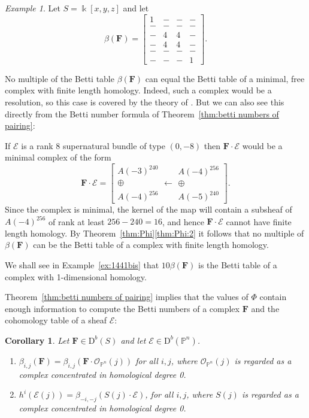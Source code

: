 \documentclass[12pt]{amsart}
\newtheorem{cor}[lemma]{Corollary}
\theoremstyle{definition}
\theoremstyle{remark}
\newtheorem{example}[lemma]{Example}
\newcommand{\kk}{\Bbbk}
\newcommand{\PP}{\mathbb{P}}
\newcommand{\cO}{\mathcal{O}}
\newcommand{\cE}{\mathcal{E}}
\newcommand{\FF}{\mathbf{F}}
\newcommand{\DD}{\mathrm{D}}
\renewcommand{\P}{{\mathbb P}}
\begin{document}
\begin{example}\label{ex:1441}
Let $S=\kk[x,y,z]$ and let
\begin{equation}\label{eqn:intro ex}
\beta(\FF)=\begin{bmatrix} 1&-&-&-\\ -&-&-&-\\-&4&4&-\\-&4&4&-\\-&-&-&-\\-&-&-&1 \end{bmatrix}.
\end{equation}

No multiple of the Betti table $\beta(\FF)$ can equal the Betti table of a minimal, free complex with finite length homology. Indeed, such a complex would be a resolution,  so this case is covered by the theory of \cite{eis-schrey1}. But we can also see this directly from the Betti number formula of Theorem~\ref{thm:betti numbers of pairing}:

If $\cE$ is a rank $8$ supernatural bundle of type $(0,-8)$ then 
$\FF\cdot \cE$ would be a minimal complex of the form
\[
\FF\cdot \cE=\left[ \begin{matrix}A(-3)^{240}\\ \oplus \\A(-4)^{256}\end{matrix} \longleftarrow \begin{matrix}A(-4)^{256}\\\oplus \\ A(-5)^{240}\end{matrix}\right].
\]
Since the complex is minimal, the kernel of the map will contain a subsheaf of $A(-4)^{256}$ of rank at least $256-240=16$, and hence $\FF\cdot \cE$ cannot have finite length homology.  By Theorem~\ref{thm:Phi}\eqref{thm:Phi:2} it follows that no multiple of $\beta(\FF)$ can be the Betti table of a complex with finite length homology. 

We shall see in Example~\ref{ex:1441bis} that 
 $10\beta(\FF)$ is the Betti table of a complex with 1-dimensional homology.
\end{example}

 Theorem~\ref{thm:betti numbers of pairing} implies that the values of $\Phi$ contain enough
 information to compute the Betti numbers of a complex $\FF$ and the cohomology
table of a sheaf $\cE$:
\begin{cor} Let $\FF\in \DD^b(S)$ and let $\cE\in \DD^b(\PP^n)$.
\begin{enumerate}
\item 
 $\beta_{i,j}(\FF) = \beta_{i,j}(\FF\cdot \cO_{\P^{n}}(j))$ for all $i,j$, where $\cO_{\PP^n}(j)$ is regarded as a complex concentrated in homological degree 0.
\item $h^{i}(\cE(j)) = \beta_{-i,-j}(S(j)\cdot \cE)$, for all $i,j$, where $S(j)$ is regarded as a complex concentrated in homological degree 0.
\end{enumerate}
\end{cor}
\end{document}

